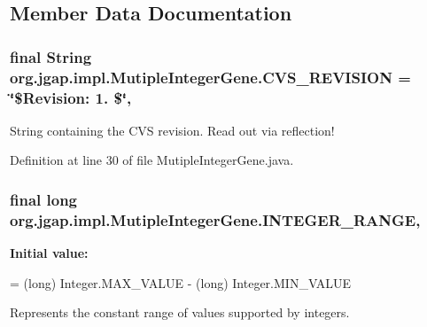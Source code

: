 \subsection{Member Data Documentation}
\hypertarget{classorg_1_1jgap_1_1impl_1_1_mutiple_integer_gene_ae1540483f82ba0abdb72adbe3e5f5eed}{
\subsubsection[{C\-V\-S\-\_\-\-R\-E\-V\-I\-S\-I\-O\-N}]{\setlength{\rightskip}{0pt plus 5cm}final String org.\-jgap.\-impl.\-Mutiple\-Integer\-Gene.\-C\-V\-S\-\_\-\-R\-E\-V\-I\-S\-I\-O\-N = \char`\"{}\$Revision\-: 1. \$\char`\"{}\hspace{0.3cm}{\ttfamily [static]}, {\ttfamily [private]}}}\label{classorg_1_1jgap_1_1impl_1_1_mutiple_integer_gene_ae1540483f82ba0abdb72adbe3e5f5eed}
String containing the C\-V\-S revision. Read out via reflection! 

Definition at line 30 of file Mutiple\-Integer\-Gene.\-java.

\hypertarget{classorg_1_1jgap_1_1impl_1_1_mutiple_integer_gene_a3d4df735f37d9af1cbc88febb02fafd4}{
\subsubsection[{I\-N\-T\-E\-G\-E\-R\-\_\-\-R\-A\-N\-G\-E}]{\setlength{\rightskip}{0pt plus 5cm}final long org.\-jgap.\-impl.\-Mutiple\-Integer\-Gene.\-I\-N\-T\-E\-G\-E\-R\-\_\-\-R\-A\-N\-G\-E\hspace{0.3cm}{\ttfamily [static]}, {\ttfamily [protected]}}}\label{classorg_1_1jgap_1_1impl_1_1_mutiple_integer_gene_a3d4df735f37d9af1cbc88febb02fafd4}
{\bfseries Initial value\-:}
\begin{DoxyCode}
= (long) Integer.MAX\_VALUE -
      (\textcolor{keywordtype}{long}) Integer.MIN\_VALUE
\end{DoxyCode}
Represents the constant range of values supported by integers. 

